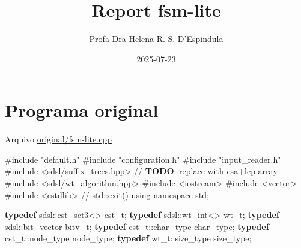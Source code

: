 \documentclass[
]{article}
\title{Report fsm-lite}
\author{Profa Dra Helena R. S. D'Espindula}
\date{2025-07-23}
\newenvironment{Shaded}{\begin{snugshade}}{\end{snugshade}}
\newcommand{\AlertTok}[1]{\textcolor[rgb]{0.58,0.85,0.30}{\textbf{\colorbox[rgb]{0.30,0.12,0.14}{#1}}}}
\newcommand{\CommentTok}[1]{\textcolor[rgb]{0.48,0.49,0.49}{#1}}
\newcommand{\ImportTok}[1]{\textcolor[rgb]{0.15,0.68,0.38}{#1}}
\newcommand{\KeywordTok}[1]{\textcolor[rgb]{0.81,0.81,0.76}{\textbf{#1}}}
\newcommand{\NormalTok}[1]{\textcolor[rgb]{0.81,0.81,0.76}{#1}}
\newcommand{\OperatorTok}[1]{\textcolor[rgb]{0.81,0.81,0.76}{#1}}
\newcommand{\PreprocessorTok}[1]{\textcolor[rgb]{0.15,0.68,0.38}{#1}}
\begin{document}
\maketitle

{
\setcounter{tocdepth}{2}
\tableofcontents
}
\section{Programa original}\label{programa-original}

Arquivo \url{original/fsm-lite.cpp}

\begin{Shaded}
\begin{Highlighting}[]
\PreprocessorTok{\#include }\ImportTok{"default.h"}
\PreprocessorTok{\#include }\ImportTok{"configuration.h"}
\PreprocessorTok{\#include }\ImportTok{"input\_reader.h"}
\PreprocessorTok{\#include }\ImportTok{\textless{}sdsl/suffix\_trees.hpp\textgreater{}}\PreprocessorTok{ }\CommentTok{// }\AlertTok{TODO}\CommentTok{: replace with csa+lcp array}
\PreprocessorTok{\#include }\ImportTok{\textless{}sdsl/wt\_algorithm.hpp\textgreater{}}
\PreprocessorTok{\#include }\ImportTok{\textless{}iostream\textgreater{}}
\PreprocessorTok{\#include }\ImportTok{\textless{}vector\textgreater{}}
\PreprocessorTok{\#include }\ImportTok{\textless{}cstdlib\textgreater{}}\PreprocessorTok{ }\CommentTok{// std::exit()}
\NormalTok{using namespace std}\OperatorTok{;}

\KeywordTok{typedef}\NormalTok{ sdsl}\OperatorTok{::}\NormalTok{cst\_sct3}\OperatorTok{\textless{}\textgreater{}}\NormalTok{ cst\_t}\OperatorTok{;}
\KeywordTok{typedef}\NormalTok{ sdsl}\OperatorTok{::}\NormalTok{wt\_int}\OperatorTok{\textless{}\textgreater{}}\NormalTok{ wt\_t}\OperatorTok{;}
\KeywordTok{typedef}\NormalTok{ sdsl}\OperatorTok{::}\NormalTok{bit\_vector bitv\_t}\OperatorTok{;}
\KeywordTok{typedef}\NormalTok{ cst\_t}\OperatorTok{::}\NormalTok{char\_type char\_type}\OperatorTok{;}
\KeywordTok{typedef}\NormalTok{ cst\_t}\OperatorTok{::}\NormalTok{node\_type node\_type}\OperatorTok{;}
\KeywordTok{typedef}\NormalTok{ wt\_t}\OperatorTok{::}\NormalTok{size\_type size\_type}\OperatorTok{;}


\end{Highlighting}
\end{Shaded}
\end{document}
